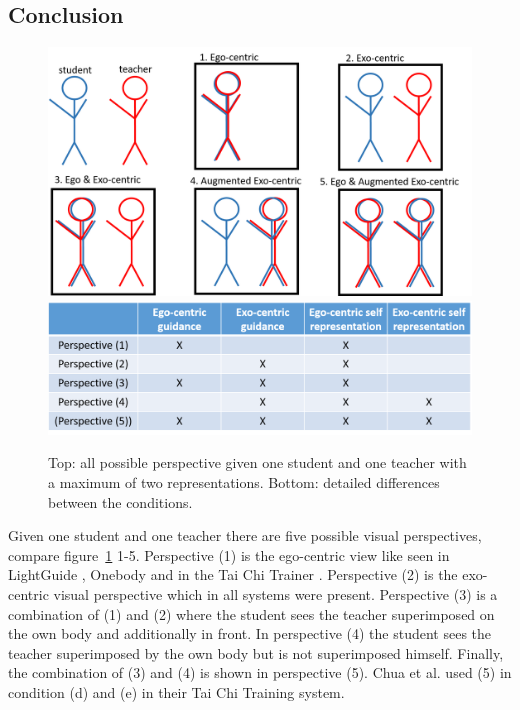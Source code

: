 \newpage
\subsection{Conclusion}
\begin{figure}[h]
	\centering
	\includegraphics[width=1.0\textwidth]{img/perspectives.png}
	\includegraphics[width=1.0\textwidth]{img/cond_detail.png}
	\caption{Top: all possible perspective given one student and one teacher with a maximum of two representations. Bottom: detailed differences between the conditions.}
	\label{fig:perspectives}
\end{figure}
Given one student and one teacher there are five possible visual perspectives, compare figure~\ref{fig:perspectives} 1-5. Perspective (1) is the ego-centric view like seen in LightGuide \cite{Sodhi2012}, Onebody \cite{Hoang2016} and in the Tai Chi Trainer \cite{Chua2003}. Perspective (2) is the exo-centric visual perspective which in all systems were present. Perspective (3) is a combination of (1) and (2) where the student sees the teacher superimposed on the own body and additionally in front. In perspective (4) the student sees the teacher superimposed by the own body but is not superimposed himself. Finally, the combination of (3) and (4) is shown in perspective (5). Chua et al. used (5) in condition (d) and (e) in their Tai Chi Training system.
